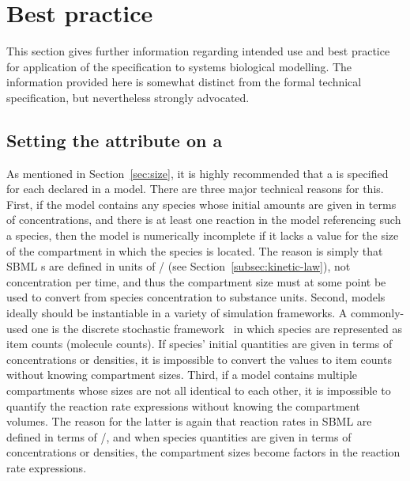 
\section{Best practice}
\label{sec:best-practice}

This section gives further information regarding intended use and
best practice for application of the specification to systems
biological modelling. The information provided here is somewhat
distinct from the formal technical specification, but nevertheless
strongly advocated.


\subsection{Setting the  attribute on a }
\label{sec:bp:size}

As mentioned in Section~\ref{sec:size}, it is highly recommended
that a  is specified for each 
declared in a model. There are three major technical reasons for
this.  First, if the model contains any species whose initial
amounts are given in terms of concentrations, and there is at
least one reaction in the model referencing such a species, then
the model is numerically incomplete if it lacks a value for the
size of the compartment in which the species is located.  The
reason is simply that SBML
\Reaction{}s are defined in units of
/ (see
Section~\ref{subsec:kinetic-law}), not concentration per time, and
thus the compartment size must at some point be used to convert
from species concentration to substance units.  Second, models
ideally should be instantiable in a variety of simulation
frameworks.  A commonly-used one is the discrete stochastic
framework~\citep{gillespie:1977,wilkinson_2006} in which species
are represented as item counts (\eg molecule counts).  If species'
initial quantities are given in terms of concentrations or
densities, it is impossible to convert the values to item counts
without knowing compartment sizes.  Third,
if a model contains multiple compartments whose sizes are not all
identical to each other, it is impossible to quantify the reaction
rate expressions without knowing the compartment volumes.  The
reason for the latter is again that reaction rates in SBML are defined
in terms of /, and when species quantities are
given in terms of concentrations or densities, the compartment
sizes become factors in the reaction rate expressions.
